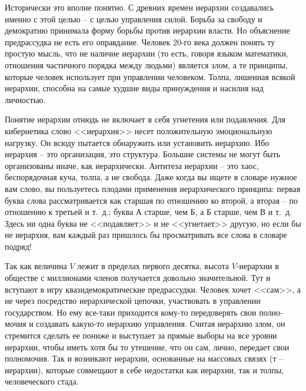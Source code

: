 \documentclass{book}
\begin{document}
Исторически это вполне понятно. С древних времен иерар­хии создавались именно с этой целью -- с целью управления си­лой. Борьба за свободу и демократию принимала форму борьбы против иерархии власти. Но объяснение предрассудка не есть его оправдание. Человек 20-го века должен понять ту простую мысль, что не наличие иерархии (то есть, говоря языком математики, отношения частичного порядка между людьми) является злом, а те принципы, которые человек использует при управлении че­ловеком. Толпа, лишенная всякой иерархии, способна на самые худшие виды принуждения и насилия над личностью.

Понятие иерархии отнюдь не включает в себя угнетения или по­давления. Для кибернетика слово <<иерархия>> несет положитель­ную эмоциональную нагрузку. Он всюду пытается обнаружить или установить иерархию. Ибо иерархия -- это организация, это структура. Большие системы не могут быть организованы иначе, как иерархически. Антитеза иерархии -- это хаос, беспорядочная куча, толпа, а не свобода. Даже когда вы ищете в словаре нужное вам слово, вы пользуетесь плодами применения иерархического принципа: первая буква слова рассматривается как старшая по отношению ко второй, а вторая -- по отношению к третьей и т.~д.; буква А старше, чем Б, а Б старше, чем В и т.~д. Здесь ни одна буква не <<подавляет>> и не <<угнетает>> другую, но если бы не ие­рархия, вам каждый раз пришлось бы просматривать все слова в словаре подряд!

Так как величина $V$  лежит в пределах первого десятка, высо­та $V$-иерархии в обществе с миллионами членов получается до­вольно значительной. Тут и вступают в игру квазидемократические предрассудки. Человек хочет <<сам>>, а не через посредство иерархической цепочки, участвовать в управлении государством. Но ему все-таки приходится кому-то передоверять свои полно­мочия и создавать какую-то иерархию управления. Считая иерар­хию злом, он стремится сделать ее пониже и выступает за пря­мые выборы на все уровни иерархии, чтобы иметь хотя бы то утешение, что он сам, лично,  передает свои полномочия. Так и возникают иерархии, основанные на массовых связях (т --  иерархии), которые совмещают в себе недостатки как иерархии, так и толпы, человеческого стада.
\end{document}
